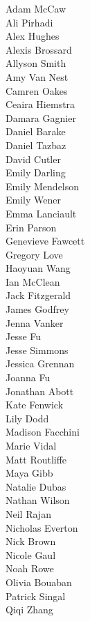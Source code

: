 \begin{multicols}{3}
\begin{center}
Adam McCaw\\
Ali Pirhadi\\
Alex Hughes\\
Alexis Brossard\\
Allyson Smith\\
Amy Van Nest\\
Camren Oakes\\
Ceaira Hiemstra\\
Damara Gagnier\\
Daniel Barake \\
Daniel Tazbaz\\
David Cutler\\
Emily Darling\\
Emily Mendelson\\
Emily Wener\\
Emma Lanciault\\
Erin Parson\\
Genevieve Fawcett\\
Gregory Love\\
Haoyuan Wang\\
Ian McClean\\
Jack Fitzgerald\\
James Godfrey\\
\columnbreak
Jenna Vanker\\
Jesse Fu\\
Jesse Simmons\\
Jessica Grennan\\
Joanna Fu\\
Jonathan Abott\\
Kate Fenwick\\
Lily Dodd\\
Madison Facchini\\
Marie Vidal\\
Matt Routliffe\\
Maya Gibb\\
Natalie Dubas\\
Nathan Wilson\\
Neil Rajan\\
Nicholas Everton\\
Nick Brown\\
Nicole Gaul\\
Noah Rowe\\
Olivia Bouaban\\
Patrick Singal\\
Qiqi Zhang\\

\end{center}
\end{multicols}
